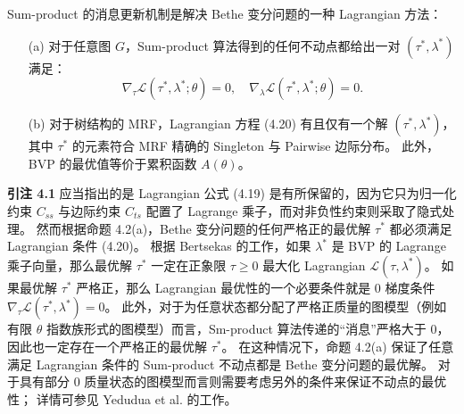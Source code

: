 \begin{tcolorbox}
\begin{prop}
    Sum-product 的消息更新机制是解决 Bethe 变分问题的一种 Lagrangian 方法：
    \begin{itemize}
        \item[(a)] 对于任意图 $G$，Sum-product 算法得到的任何不动点都给出一对 $(\tau^*, \lambda^*)$ 满足：
            \begin{equation}
                \nabla_{\tau}\mathcal{L}(\tau^*, \lambda^*; \theta) = 0, \quad \nabla_{\lambda}\mathcal{L}(\tau^*, \lambda^*; \theta) = 0.
            \end{equation}
        \item[(b)] 对于树结构的 MRF，Lagrangian 方程 (4.20) 有且仅有一个解 $(\tau^*, \lambda^*)$，其中 $\tau^*$ 的元素符合 MRF 精确的 Singleton 与 Pairwise 边际分布。
            此外，BVP 的最优值等价于累积函数 $A(\theta)$。
    \end{itemize}
\end{prop}
\end{tcolorbox}

\begin{tcolorbox}
\textbf{引注 4.1} 
    应当指出的是 Lagrangian 公式 (4.19) 是有所保留的，因为它只为归一化约束 $C_{ss}$ 与边际约束 $C_{ts}$ 配置了 Lagrange 乘子，而对非负性约束则采取了隐式处理。
    然而根据命题 4.2(a)，Bethe 变分问题的任何严格正的最优解 $\tau^*$ 都必须满足 Lagrangian 条件 (4.20)。
    根据 Bertsekas 的工作，如果 $\lambda^*$ 是 BVP 的 Lagrange 乘子向量，那么最优解 $\tau^*$ 一定在正象限 $\tau \geq 0$ 最大化 Lagrangian $\mathcal{L}(\tau, \lambda^*)$。
    如果最优解 $\tau^*$ 严格正，那么 Lagrangian 最优性的一个必要条件就是 0 梯度条件 $\nabla_{\tau}\mathcal{L}(\tau^*, \lambda^*) = 0$。
    此外，对于为任意状态都分配了严格正质量的图模型（例如有限 $\theta$ 指数族形式的图模型）而言，Sm-product 算法传递的“消息”严格大于 0，因此也一定存在一个严格正的最优解 $\tau^*$。
    在这种情况下，命题 4.2(a) 保证了任意满足 Lagrangian 条件的 Sum-product 不动点都是 Bethe 变分问题的最优解。
    对于具有部分 0 质量状态的图模型而言则需要考虑另外的条件来保证不动点的最优性；
    详情可参见 Yedudua et al. 的工作。
\end{tcolorbox}

